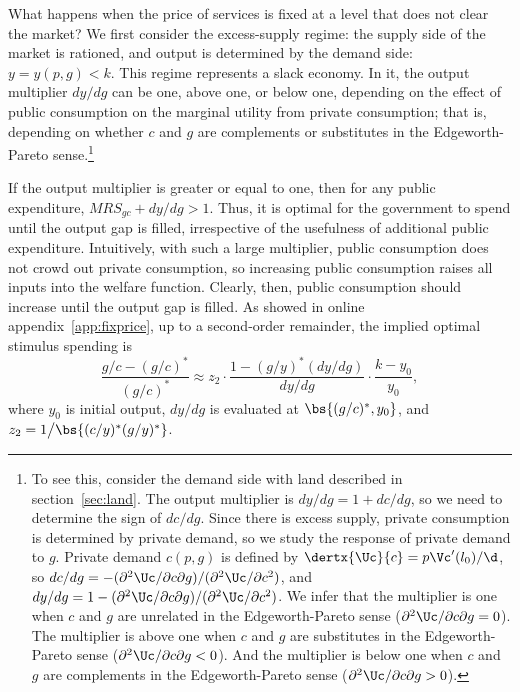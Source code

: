 \documentclass[letterpaper,12pt,leqno]{article}
\begin{document}
\begin{bibunit}
What happens when the price of services is fixed at a level that does not clear the market?  We first consider the excess-supply regime: the supply side of the market is rationed, and output is determined by the demand side: $y = y(p,g)<k$. This regime represents a slack economy. In it, the output multiplier $dy/dg$ can be one, above one, or below one, depending on the effect of public consumption on the marginal utility from private consumption; that is, depending on whether $c$ and $g$ are complements or substitutes in the Edgeworth-Pareto sense.\footnote{To see this, consider the demand side with land described in section~\ref{sec:land}. The output multiplier is $dy/dg = 1 + dc/dg$, so we need to determine the sign of $dc/dg$. Since there is excess supply, private consumption is determined by private demand, so we study the response of private demand to $g$. Private demand $c(p,g)$ is defined by $\dertx{\Uc}{c}=p \Vc'(l_0)/\d$, so $dc/dg=-(\partial^2 \Uc/\partial c \partial g)/(\partial^2 \Uc/\partial c^2)$,  and $dy/dg=1-(\partial^2 \Uc/\partial c \partial g)/(\partial^2 \Uc/\partial c^2)$. We infer that the multiplier is one when $c$ and $g$ are unrelated in the Edgeworth-Pareto sense ($\partial^2 \Uc/\partial c \partial g = 0$). The multiplier is above one when $c$ and $g$ are substitutes in the Edgeworth-Pareto sense ($\partial^2 \Uc/\partial c \partial g < 0$). And the multiplier is below one when $c$ and $g$ are complements in the Edgeworth-Pareto sense ($\partial^2 \Uc/\partial c \partial g > 0$).}

If the output multiplier is greater or equal to one, then for any public expenditure, $MRS_{gc}+dy/dg>1$. Thus, it is optimal for the government to spend until the output gap is filled, irrespective of the usefulness of additional public expenditure. Intuitively, with such a large multiplier, public consumption does not crowd out private consumption, so increasing public consumption raises all inputs into the welfare function. Clearly, then, public consumption should increase until the output gap is filled. As showed in online appendix~\ref{app:fixprice}, up to a second-order remainder, the implied optimal stimulus spending is
\begin{equation}
\frac{g/c-(g/c)^{*}}{(g/c)^{*}}  \approx z_2 \cdot \frac{1 - (g/y)^* (dy/dg)}{dy/dg} \cdot \frac{k - y_0}{y_0},
\label{eq:explicit2}\end{equation}
where $y_0$ is initial output, $dy/dg$ is evaluated at $\bs{(g/c)^*,y_0}$, and $z_2 = 1\big/\bs{(c/y)^* (g/y)^*}$.


\end{bibunit}
\end{document}

